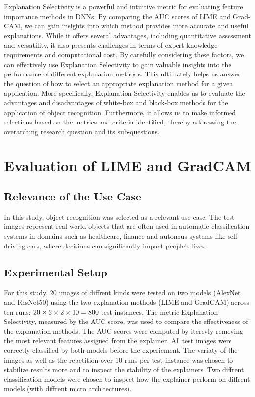\documentclass{article}
\begin{document}
Explanation Selectivity is a powerful and intuitive metric for evaluating feature importance methods in DNNs. By comparing the AUC scores of LIME and Grad-CAM, we can gain insights into which method provides more accurate and useful explanations. While it offers several advantages, including quantitative assessment and versatility, it also presents challenges in terms of expert knowledge requirements and computational cost. By carefully considering these factors, we can effectively use Explanation Selectivity to gain valuable insights into the performance of different explanation methods. This ultimately helps us answer the question of how to select an appropriate explanation method for a given application. More specifically, Explanation Selectivity enables us to evaluate the advantages and disadvantages of white-box and black-box methods for the application of object recognition. Furthermore, it allows us to make informed selections based on the metrics and criteria identified, thereby addressing the overarching research question and its sub-questions.

\section{Evaluation of LIME and GradCAM}
\subsection{Relevance of the Use Case}
In this study, object recognition was selected as a relevant use case. The test images represent real-world objects that are often used in automatic classification systems in domains such as healthcare, finance and autonous systems like self-driving cars, where decisions can significantly impact people's lives.

\subsection{Experimental Setup}
For this study, 20 images of diffrent kinds were tested on two models (AlexNet and ResNet50) using the two explanation methods (LIME and GradCAM) across ten runs: $ 20 \times 2 \times 2 \times 10 = 800 \space $  test instances.
The metric Explanation Selectivity, measured by the AUC score, was used to compare the effectiveness of the explanation methods. 
The AUC scores were computed by iterevly removing the most relevant features assigned from the explainer. 
All test images were correctly classified by both models before the experiement. The variaty of the images as well as the repetition over 10 runs per test instance was chosen to stabilize results more and to inspect the stability of the explainers. Two diffrent classification models were chosen to inspect how the explainer perform on diffrent models (with diffrent micro architectures).
\end{document}
